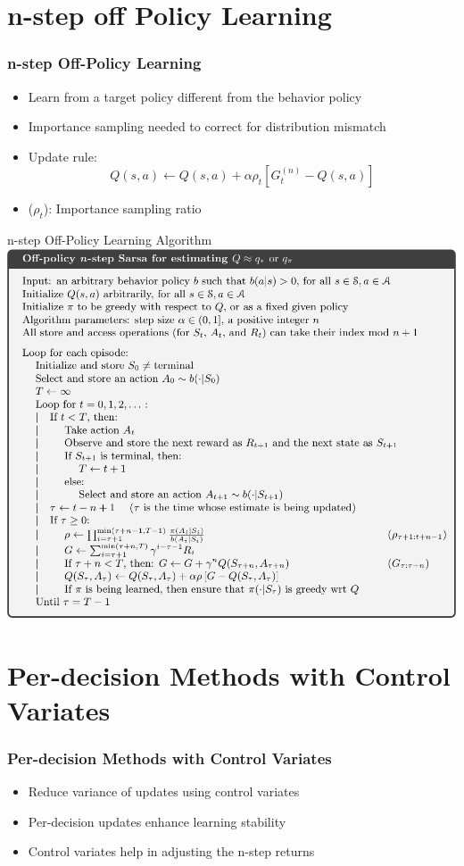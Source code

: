 \documentclass{beamer}
\begin{document}
    \section{n-step off Policy Learning}
    \begin{frame}
        \frametitle{n-step Off-Policy Learning}
        \begin{itemize}
            \item Learn from a target policy different from the behavior policy
            \item Importance sampling needed to correct for distribution mismatch
            \item Update rule:
            $$
            Q(s,a) \leftarrow Q(s,a) + \alpha \rho_t \left[G_t^{(n)} - Q(s,a)\right]
            $$
            \item ($\rho_t$): Importance sampling ratio
        \end{itemize}
    \end{frame}

    \begin{frame}{n-step Off-Policy Learning Algorithm}
        \includegraphics[width=\textwidth]{public/n-step-offp}
    \end{frame}

    \section{Per-decision Methods with Control Variates}
    \begin{frame}
        \frametitle{Per-decision Methods with Control Variates}
        \begin{itemize}
            \item Reduce variance of updates using control variates
            \item Per-decision updates enhance learning stability
            \item Control variates help in adjusting the n-step returns
        \end{itemize}
    \end{frame}
\end{document}
